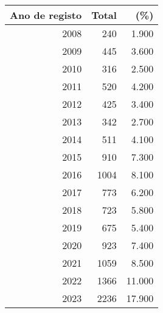 \begin{tabular}{rrr}
\toprule
Ano de registo & Total & (\%) \\
\midrule
2008 & 240 & 1.900 \\
2009 & 445 & 3.600 \\
2010 & 316 & 2.500 \\
2011 & 520 & 4.200 \\
2012 & 425 & 3.400 \\
2013 & 342 & 2.700 \\
2014 & 511 & 4.100 \\
2015 & 910 & 7.300 \\
2016 & 1004 & 8.100 \\
2017 & 773 & 6.200 \\
2018 & 723 & 5.800 \\
2019 & 675 & 5.400 \\
2020 & 923 & 7.400 \\
2021 & 1059 & 8.500 \\
2022 & 1366 & 11.000 \\
2023 & 2236 & 17.900 \\
\bottomrule
\end{tabular}
